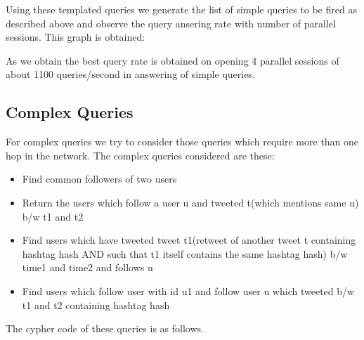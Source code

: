 \documentclass[letterpaper,10pt,english]{sphinxmanual}
\begin{document}
Using these templated queries we generate the list of simple queries to be fired as described above and observe the query ansering rate with number of parallel sessions. This graph is obtained:

\noindent{}

As we obtain the best query rate is obtained on opening 4 parallel sessions of about 1100 queries/second in answering of simple queries.


\subsection{Complex Queries}
\label{\detokenize{benchmarking:complex-queries}}
For complex queries we try to consider those queries which require more than one hop in the network. The complex queries considered are these:
\begin{itemize}
\item {} 
Find common followers of two users

\item {} 
Return the users which follow a user u and tweeted t(which mentions same u) b/w t1 and t2

\item {} 
Find users which have tweeted tweet t1(retweet of another tweet t containing hashtag hash AND such that t1 itself contains the same hashtag hash) b/w time1 and time2 and follows u

\item {} 
Find users which follow user with id u1 and follow user u which tweeted b/w t1 and t2 containing hashtag hash

\end{itemize}

The cypher code of these queries is as follows.
\end{document}
